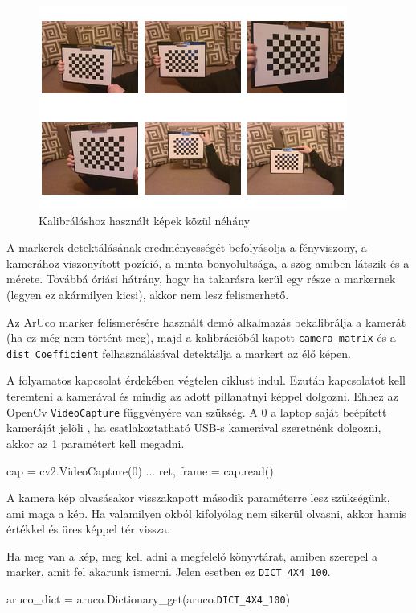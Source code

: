 \begin{figure}[htp]
    \centering
   	\includegraphics[width=7truecm, height=6truecm]{images/calibration.jpg}
	\caption{Kalibráláshoz használt képek közül néhány}
\end{figure}



A markerek detektálásának eredményességét befolyásolja a fényviszony, a kamerához viszonyított pozíció, a minta bonyolultsága, a szög amiben látszik és a mérete. Továbbá óriási hátrány, hogy ha takarásra kerül egy része a markernek (legyen ez akármilyen kicsi), akkor nem lesz felismerhető.

Az ArUco marker felismerésére használt demó alkalmazás bekalibrálja a kamerát (ha ez még nem történt meg), majd a kalibrációból kapott \texttt{camera\_matrix} és a \texttt{dist\_Coefficient} felhasználásával detektálja a markert az élő képen.

A folyamatos kapcsolat érdekében végtelen ciklust indul.
Ezután kapcsolatot kell teremteni a kamerával és mindig az adott pillanatnyi képpel dolgozni. 
Ehhez az OpenCv \texttt{VideoCapture} függvényére van szükség. A 0 a laptop saját beépített kameráját jelöli , ha csatlakoztatható USB-s kamerával szeretnénk dolgozni, akkor az 1 paramétert kell megadni.

\begin{python}
cap = cv2.VideoCapture(0)
...
ret, frame = cap.read()
\end{python}
A kamera kép olvasásakor visszakapott második paraméterre lesz szükségünk, ami maga a kép. Ha valamilyen okból kifolyólag nem sikerül olvasni, akkor hamis értékkel és üres képpel tér vissza.

Ha meg van a kép, meg kell adni a megfelelő könyvtárat, amiben szerepel a marker, amit fel akarunk ismerni. Jelen esetben ez  \texttt{DICT\_4X4\_100}.
\begin{python}
aruco_dict = aruco.Dictionary_get(aruco.\texttt{DICT\_4X4\_100})
\end{python}

